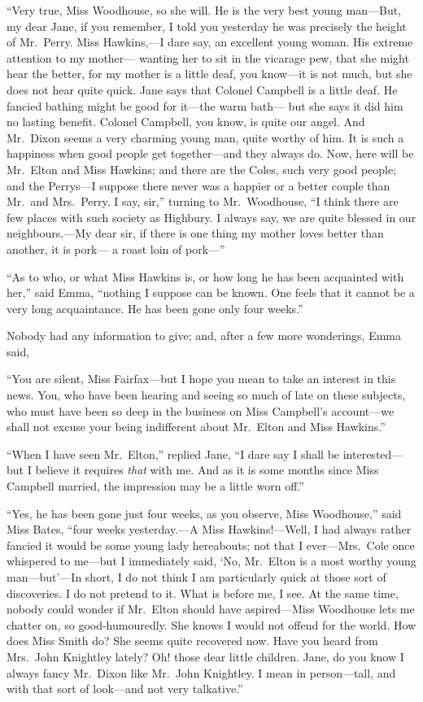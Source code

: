 ``Very true, Miss Woodhouse, so she will.  He is the very best
young man---But, my dear Jane, if you remember, I told you yesterday
he was precisely the height of Mr.\ Perry.  Miss Hawkins,---I dare say,
an excellent young woman.  His extreme attention to my mother---%
wanting her to sit in the vicarage pew, that she might hear the better,
for my mother is a little deaf, you know---it is not much, but she
does not hear quite quick.  Jane says that Colonel Campbell is a
little deaf.  He fancied bathing might be good for it---the warm bath---%
but she says it did him no lasting benefit.  Colonel Campbell,
you know, is quite our angel.  And Mr.\ Dixon seems a very charming
young man, quite worthy of him.  It is such a happiness when good
people get together---and they always do.  Now, here will be Mr.\ Elton
and Miss Hawkins; and there are the Coles, such very good people;
and the Perrys---I suppose there never was a happier or a better couple
than Mr.\ and Mrs.\ Perry.  I say, sir,'' turning to Mr.\ Woodhouse,
``I think there are few places with such society as Highbury.
I always say, we are quite blessed in our neighbours.---My dear sir,
if there is one thing my mother loves better than another, it is pork---%
a roast loin of pork---''

``As to who, or what Miss Hawkins is, or how long he has been
acquainted with her,'' said Emma, ``nothing I suppose can be known.
One feels that it cannot be a very long acquaintance.  He has been
gone only four weeks.''

Nobody had any information to give; and, after a few more wonderings,
Emma said,

``You are silent, Miss Fairfax---but I hope you mean to take
an interest in this news.  You, who have been hearing and seeing
so much of late on these subjects, who must have been so deep
in the business on Miss Campbell's account---we shall not excuse
your being indifferent about Mr.\ Elton and Miss Hawkins.''

``When I have seen Mr.\ Elton,'' replied Jane, ``I dare say I
shall be interested---but I believe it requires \emph{that} with me.
And as it is some months since Miss Campbell married, the impression
may be a little worn off.''

``Yes, he has been gone just four weeks, as you observe, Miss Woodhouse,''
said Miss Bates, ``four weeks yesterday.---A Miss Hawkins!---Well, I had
always rather fancied it would be some young lady hereabouts;
not that I ever---Mrs.\ Cole once whispered to me---but I immediately said,
`No, Mr.\ Elton is a most worthy young man---but'---In short, I do
not think I am particularly quick at those sort of discoveries.
I do not pretend to it.  What is before me, I see.  At the same time,
nobody could wonder if Mr.\ Elton should have aspired---Miss Woodhouse
lets me chatter on, so good-humouredly. She knows I would not
offend for the world.  How does Miss Smith do?  She seems quite
recovered now.  Have you heard from Mrs.\ John Knightley lately?
Oh! those dear little children.  Jane, do you know I always fancy
Mr.\ Dixon like Mr.\ John Knightley.  I mean in person---tall, and with
that sort of look---and not very talkative.''

